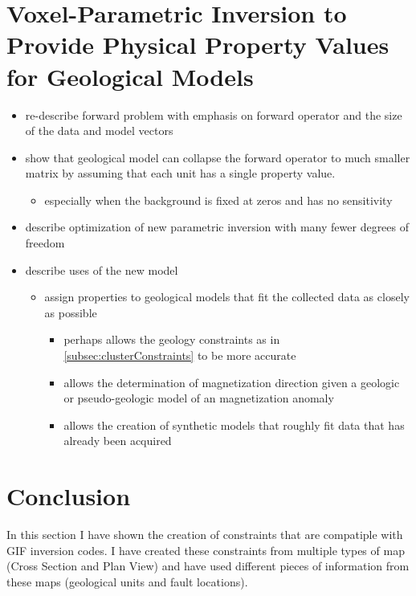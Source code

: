 \section{Voxel-Parametric Inversion to Provide Physical Property Values for Geological Models}
\label{sec:voxelParam}


\begin{itemize}
 \item re-describe forward problem with emphasis on forward operator and the size of the data and model vectors
 \item show that geological model can collapse the forward operator to much smaller matrix by assuming that each unit has a single property value.
 \begin{itemize}
  \item especially when the background is fixed at zeros and has no sensitivity
 \end{itemize}
 \item describe optimization of new parametric inversion with many fewer degrees of freedom
 \item describe uses of the new model
 \begin{itemize}
  \item assign properties to geological models that fit the collected data as closely as possible
  \begin{itemize}
   \item perhaps allows the geology constraints as in \autoref{subsec:clusterConstraints} to be more accurate
   \item allows the determination of magnetization direction given a geologic or pseudo-geologic model of an magnetization anomaly   
   \item allows the creation of synthetic models that roughly fit data that has already been acquired
  \end{itemize}
 \end{itemize}
\end{itemize}



\section{Conclusion}
\label{sec:GIFtoolsConc}

In this section I have shown the creation of constraints that are compatiple with \ac{GIF} inversion codes. I have created these constraints from multiple types of map (Cross Section and Plan View) and have used different pieces of information from these maps (geological units and fault locations).



